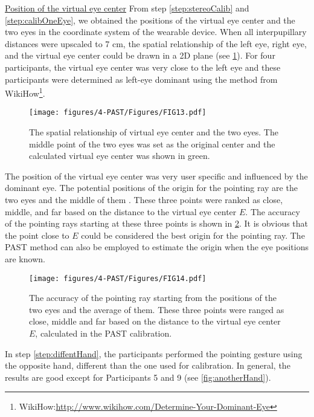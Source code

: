 \underline{Position of the virtual eye center} From step \ref{step:stereoCalib} and \ref{step:calibOneEye}, we obtained the positions of the virtual eye center and the two eyes in the coordinate system of the wearable device. When all interpupillary distances were upscaled to 7 cm, the spatial relationship of the left eye, right eye, and the virtual eye center could be drawn in a 2D plane (see \figurename{ \ref{fig:virtualEye}}). For four participants, the virtual eye center was very close to the left eye and these participants were determined as left-eye dominant using the method from  WikiHow\footnote{WikiHow:\url{http://www.wikihow.com/Determine-Your-Dominant-Eye}}.
\begin{figure} 
	\centering
	\texttt{[image: figures/4-PAST/Figures/FIG13.pdf]}
	\caption{The spatial relationship of virtual eye center and the two eyes. The middle point of the two eyes was set as the original center and the calculated virtual eye center was shown in green.}
	\label{fig:virtualEye}
\end{figure}
The position of the virtual eye center was very user specific and influenced by the dominant eye. The potential positions of the origin for the pointing ray are the two eyes and the middle of them \citep{Forsberg1996}. These three points were ranked as close, middle, and far based on the distance to the virtual eye center $E$. The accuracy of the pointing rays starting at these three points is shown in \figurename{ \ref{fig:threeEyePositions}}. It is obvious that the point close to $E$ could be considered the best origin for the pointing ray. The PAST method can also be employed to estimate the origin when the eye positions are known.
\begin{figure} 
	\centering
	\texttt{[image: figures/4-PAST/Figures/FIG14.pdf]}
	\caption{The accuracy of the pointing ray starting from the positions of the two eyes and the average of them. These three points were ranged as close, middle and far based on the distance to the virtual eye center $E$, calculated in the PAST calibration.}
	\label{fig:threeEyePositions}
\end{figure}
In step \ref{step:diffentHand}, the participants performed the pointing gesture using the opposite hand, different than the one used for calibration. In general, the results are good except for Participants 5 and 9 (see \figurename{ \ref{fig:anotherHand}}).  
